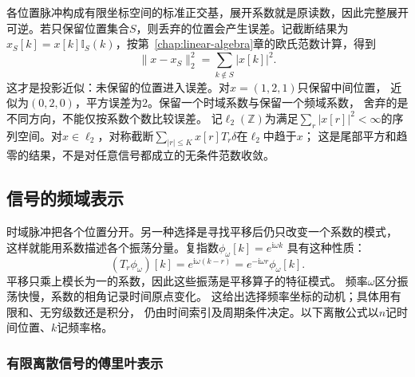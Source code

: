 各位置脉冲构成有限坐标空间的标准正交基，展开系数就是原读数，因此完整展开
可逆。若只保留位置集合$S$，则丢弃的位置会产生误差。记截断结果为
$x_S[k]=x[k]\mathbb I_S(k)$，按第~\ref{chap:linear-algebra}章的欧氏范数计算，得到
\[
  \|x-x_S\|_2^2=\sum_{k\notin S}|x[k]|^2.
\]
这才是投影近似：未保留的位置进入误差。对$x=(1,2,1)$只保留中间位置，
近似为$(0,2,0)$，平方误差为$2$。保留一个时域系数与保留一个频域系数，
舍弃的是不同方向，不能仅按系数个数比较误差。
记$\ell_2(\mathbb Z)$为满足$\sum_r|x[r]|^2<\infty$的序列空间。对$x\in\ell_2$，对称截断$\sum_{|r|\leq K}x[r]T_r\delta$在$\ell_2$中趋于$x$；
这是尾部平方和趋零的结果，不是对任意信号都成立的无条件范数收敛。

\subsection{信号的频域表示}
\label{sec:signal-analysis-frequency-representation}

时域脉冲把各个位置分开。另一种选择是寻找平移后仍只改变一个系数的模式，
这样就能用系数描述各个振荡分量。复指数$\phi_\omega[k]=e^{\mathrm i\omega k}$
具有这种性质：
\[
  (T_r\phi_\omega)[k]
  =e^{\mathrm i\omega(k-r)}
  =e^{-\mathrm i\omega r}\phi_\omega[k].
\]
平移只乘上模长为一的系数，因此这些振荡是平移算子的特征模式。
频率$\omega$区分振荡快慢，系数的相角记录时间原点变化。
这给出选择频率坐标的动机；具体用有限和、无穷级数还是积分，
仍由时间索引及周期条件决定。以下离散公式以$n$记时间位置、$k$记频率格。

\subsubsection{有限离散信号的傅里叶表示}

